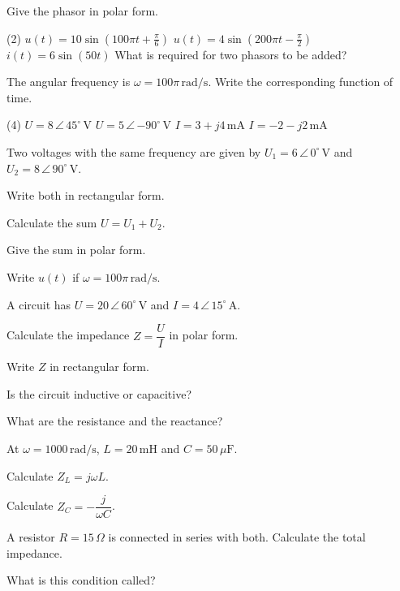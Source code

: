 Give the phasor in polar form.
\begin{delar}(2)
  \task $u(t) = 10\sin\left(100\pi t + \frac{\pi}{6}\right)$
  \task $u(t) = 4\sin\left(200\pi t - \frac{\pi}{2}\right)$
  \task* $i(t) = 6\sin(50t)$
  \task* What is required for two phasors to be added?
\end{delar}

The angular frequency is $\omega = 100\pi\,\text{rad/s}$. Write the corresponding function of time.
\begin{delar}(4)
  \task $U = 8\,\angle\,45^{\circ}\,\text{V}$
  \task $U = 5\,\angle\,{-90^{\circ}}\,\text{V}$
  \task $I = 3 + j4\,\text{mA}$
  \task $I = -2 - j2\,\text{mA}$
\end{delar}

Two voltages with the same frequency are given by $U_1 = 6\,\angle\,0^{\circ}\,\text{V}$ and
$U_2 = 8\,\angle\,90^{\circ}\,\text{V}$.
\begin{parts}
  \item Write both in rectangular form.
  \item Calculate the sum $U = U_1 + U_2$.
  \item Give the sum in polar form.
  \item Write $u(t)$ if $\omega = 100\pi\,\text{rad/s}$.
\end{parts}

A circuit has $U = 20\,\angle\,60^{\circ}\,\text{V}$ and $I = 4\,\angle\,15^{\circ}\,\text{A}$.
\begin{parts}
  \item Calculate the impedance $Z = \dfrac{U}{I}$ in polar form.
  \item Write $Z$ in rectangular form.
  \item Is the circuit inductive or capacitive?
  \item What are the resistance and the reactance?
\end{parts}

At $\omega = 1000\,\text{rad/s}$, $L = 20\,\text{mH}$ and $C = 50\,\mu\text{F}$.
\begin{parts}
  \item Calculate $Z_L = j\omega L$.
  \item Calculate $Z_C = -\dfrac{j}{\omega C}$.
  \item A resistor $R = 15\,\Omega$ is connected in series with both. Calculate the total
    impedance.
  \item What is this condition called?
\end{parts}

